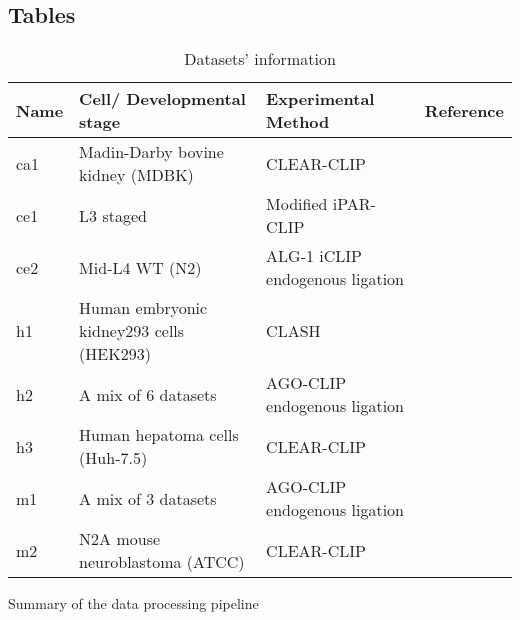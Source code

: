 \documentclass{bmcart}
\begin{document}
\begin{backmatter}
\clearpage
\section*{Tables}
\begin{table}[h!]
\caption{Datasets' information}
\label{tbl:dataset_description}
\begin{tabular}{|l|p{5cm}|p{4cm}|l|}
	\hline
	\textbf{Name} & \textbf{Cell/ Developmental stage} & \textbf{Experimental Method} & \textbf{Reference} \\
	\hline
	
    ca1 &
	Madin-Darby bovine kidney (MDBK) &
	CLEAR-CLIP                        
	& \cite{scheel2017global} \\
	\hline
	
    ce1 &
	L3 staged & 
	Modified iPAR-CLIP & 
	\cite{grosswendt2014unambiguous}  \\
	\hline

    ce2 &
	Mid-L4 WT (N2)  & 
	ALG-1 iCLIP endogenous ligation & 
	\cite{broughton2016pairing} \\
	\hline

    h1 &
	Human embryonic kidney293 cells (HEK293) & 
	CLASH  & 
	\cite{helwak2013mapping} \\
	\hline
	
    h2 &
	A mix of 6 datasets & 
	AGO-CLIP endogenous ligation &  
	\cite{grosswendt2014unambiguous} \\
	\hline
	
    h3 &
	Human hepatoma cells (Huh-7.5) & 
	CLEAR-CLIP & 
	\cite{darnell_moore2015mirna} \\
	\hline
	
    m1 &
	A mix of 3 datasets & 
	AGO-CLIP endogenous ligation & 
	\cite{grosswendt2014unambiguous} \\
	\hline
	
    m2 &
	N2A mouse neuroblastoma (ATCC) & 
	CLEAR-CLIP & 
	\cite{darnell_moore2015mirna} \\
	\hline
\end{tabular}
\end{table}

\begin{table}[h!]
\caption{Summary of the data processing pipeline}
      \label{tal:pipeline_summary}
                 \begin{threeparttable}
                 \resizebox{\textwidth}{!}{%

}
\end{threeparttable}
\end{table}
\end{backmatter}
\end{document}
